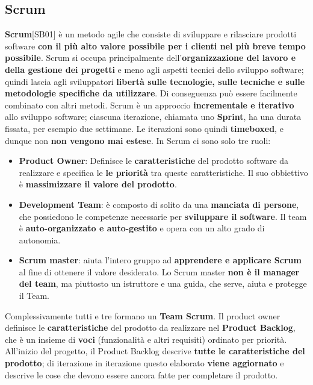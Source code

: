 \documentclass[12pt]{article}
\begin{document}
\subsection{Scrum}
\textbf{Scrum}[SB01] è un metodo agile che consiste di sviluppare e rilasciare prodotti software \textbf{con il più alto valore possibile per i clienti nel più breve tempo possibile}.
Scrum si occupa principalmente dell'\textbf{organizzazione del lavoro e della gestione dei progetti} e meno agli aspetti tecnici dello sviluppo software; quindi lascia agli sviluppatori \textbf{libertà sulle tecnologie, sulle tecniche e sulle metodologie specifiche da utilizzare}.
Di conseguenza può essere facilmente combinato con altri metodi. \newline
Scrum è un approccio \textbf{incrementale e iterativo} allo sviluppo software; ciascuna iterazione, chiamata uno \textbf{Sprint}, ha una durata fissata, per esempio due settimane.
Le iterazioni sono quindi \textbf{timeboxed}, e dunque non \textbf{non vengono mai estese}.
In Scrum ci sono solo tre ruoli:
\begin{itemize}
    \item \textbf{Product Owner}: Definisce le \textbf{caratteristiche} del prodotto software da realizzare e specifica le \textbf{le priorità} tra queste caratteristiche.
    Il suo obbiettivo è \textbf{massimizzare il valore del prodotto}.
    \item \textbf{Development Team}: è composto di solito da una \textbf{manciata di persone}, che possiedono le competenze necessarie per \textbf{sviluppare il software}.
    Il team è \textbf{auto-organizzato e auto-gestito} e opera con un alto grado di autonomia.
    \item \textbf{Scrum master}: aiuta l'intero gruppo ad \textbf{apprendere e applicare Scrum} al fine di ottenere il valore desiderato.
    Lo Scrum master \textbf{non è il manager del team}, ma piuttosto un istruttore e una guida, che serve, aiuta e protegge il Team.
\end{itemize}
Complessivamente tutti e tre formano un \textbf{Team Scrum}. \newline
Il product owner definisce le \textbf{caratteristiche} del prodotto da realizzare nel \textbf{Product Backlog}, che è un insieme di \textbf{voci} (funzionalità e altri requisiti) ordinato per priorità.
All'inizio del progetto, il Product Backlog descrive \textbf{tutte le caratteristiche del prodotto}; di iterazione in iterazione questo elaborato \textbf{viene aggiornato} e descrive le cose che devono essere ancora fatte per completare il prodotto.
\end{document}
